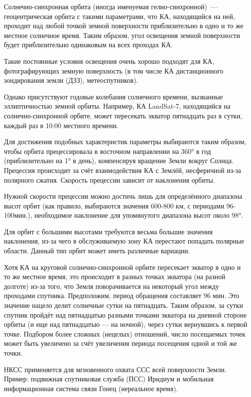 \documentclass[14pt,a4paper,oneside]{extarticle}
\begin{document}
Солнечно-синхронная орбита (иногда именуемая гелио-синхронной) — геоцентрическая орбита с такими параметрами, что КА, находящийся на ней, проходит над любой точкой земной поверхности приблизительно в одно и то же местное солнечное время. Таким образом, угол освещения земной поверхности будет приблизительно одинаковым на всех проходах КА.

Такие постоянные условия освещения очень хорошо подходят для КА, фотографирующих земную поверхность (в том числе КА дистанционного зондирования земли (ДЗЗ), метеоспутников).

Однако присутствуют годовые колебания солнечного времени, вызванные эллиптичностью земной орбиты. Например, КА LandSat-7, находящийся на солнечно-синхронной орбите, может пересекать экватор пятнадцать раз в сутки, каждый раз в 10:00 местного времени.

Для достижения подобных характеристик параметры выбираются таким образом, чтобы орбита прецессировала в восточном направлении на 360° в год (приблизительно на 1° в день), компенсируя вращение Земли вокруг Солнца. Прецессия происходит за счёт взаимодействия КА с Землёй, несферичной из-за полярного сжатия. Скорость прецессии зависит от наклонения орбиты.

Нужной скорости прецессии можно достичь лишь для определённого диапазона высот орбит (как правило, выбираются значения 600-800 км, с периодами 96-100мин.), необходимое наклонение для упомянутого диапазона высот около 98°.

Для орбит с большими высотами требуются весьма большие значения наклонения, из-за чего в обслуживаемую зону КА перестают попадать полярные области. Данный тип орбит может иметь различные вариации.

Хотя КА на круговой солнечно-синхронной орбите пересекает экватор в одно и то же местное время, это происходит в разных точках экватора (на разной долготе) из-за того, что Земля поворачивается на некоторый угол между проходами спутника. Предположим, период обращения составляет 96 мин. Это значение нацело делит солнечные сутки на пятнадцать. Таким образом, за сутки спутник пройдёт над пятнадцатью разными точками экватора на дневной стороне орбиты (и еще над пятнадцатью — на ночной), через сутки вернувшись к первой точке. Подбором более сложных (нецелых) отношений, число посещаемых точек может быть увеличено за счёт увеличения периода посещения одной и той же точки.

НКСС применяется для мгновенного охвата ССС всей поверхности Земли. Пример: подвижная спутниковая служба (ПСС) Иридиум и мобильная информационная система связи Гонец (нереальное время).
\end{document}
